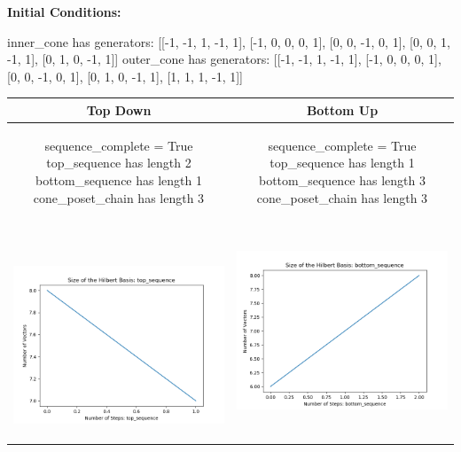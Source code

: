 \documentclass[10pt]{article}
\begin{document}
\textbf{Initial Conditions:}
\begin{SAGE}
inner_cone has generators: 
[[-1, -1, 1, -1, 1], [-1, 0, 0, 0, 1], [0, 0, -1, 0, 1], [0, 0, 1, -1, 1], [0, 1, 0, -1, 1]]
outer_cone has generators: 
[[-1, -1, 1, -1, 1], [-1, 0, 0, 0, 1], [0, 0, -1, 0, 1], [0, 1, 0, -1, 1], [1, 1, 1, -1, 1]]

\end{SAGE}
\begin{tabular}{c|c}
\textbf{Top Down} & \textbf{Bottom Up} \\ \hline  
\begin{SAGE}
	sequence_complete = True
	top_sequence has length 2
	bottom_sequence has length 1
	cone_poset_chain has length 3
\end{SAGE} 
&
\begin{SAGE}
	sequence_complete = True
	top_sequence has length 1
	bottom_sequence has length 3
	cone_poset_chain has length 3
\end{SAGE} 
\\ \hline
\
\begin{minipage}{.45\textwidth}
\includegraphics[width=\textwidth]{"DATA/5d/5 generators 1 bound A/top_sequence SIZE"}
\end{minipage} &
\begin{minipage}{.45\textwidth}
\includegraphics[width=\textwidth]{"DATA/5d/5 generators 1 bound A bottomup/bottom_sequence SIZE"}

\end{minipage}
\end{tabular}
\end{document}
